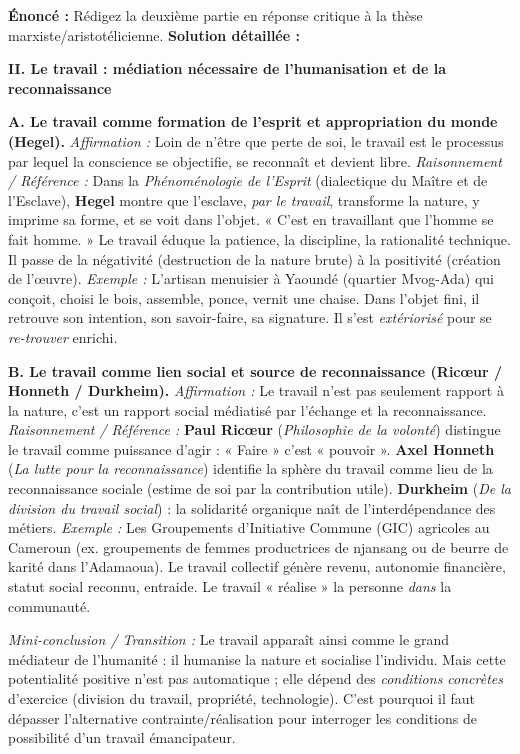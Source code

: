 \documentclass[11pt]{article}
\newcommand{\cle}[1]{{\popxbold\color{popdark}#1}}
\begin{document}
\begin{exoresolu}
\textbf{Énoncé :} Rédigez la deuxième partie en réponse critique à la thèse marxiste/aristotélicienne.
\tcblower
\textbf{Solution détaillée :}

\textbf{II. Le travail : médiation nécessaire de l'humanisation et de la reconnaissance}

\textbf{A. Le travail comme formation de l'esprit et appropriation du monde (Hegel).}
\textit{Affirmation :} Loin de n'être que perte de soi, le travail est le processus par lequel la conscience se objectifie, se reconnaît et devient libre.
\textit{Raisonnement / Référence :} Dans la \emph{Phénoménologie de l'Esprit} (dialectique du Maître et de l'Esclave), \textbf{Hegel} montre que l'esclave, \emph{par le travail}, transforme la nature, y imprime sa forme, et se voit dans l'objet. « C'est en travaillant que l'homme se fait homme. » Le travail éduque la patience, la discipline, la rationalité technique. Il passe de la \cle{négativité} (destruction de la nature brute) à la \cle{positivité} (création de l'œuvre).
\textit{Exemple :} L'artisan menuisier à Yaoundé (quartier Mvog-Ada) qui conçoit, choisi le bois, assemble, ponce, vernit une chaise. Dans l'objet fini, il retrouve son intention, son savoir-faire, sa signature. Il s'est \emph{extériorisé} pour se \emph{re-trouver} enrichi.

\textbf{B. Le travail comme lien social et source de reconnaissance (Ricœur / Honneth / Durkheim).}
\textit{Affirmation :} Le travail n'est pas seulement rapport à la nature, c'est un rapport social médiatisé par l'échange et la reconnaissance.
\textit{Raisonnement / Référence :} \textbf{Paul Ricœur} (\emph{Philosophie de la volonté}) distingue le travail comme \cle{puissance d'agir} : « Faire » c'est « pouvoir ». \textbf{Axel Honneth} (\emph{La lutte pour la reconnaissance}) identifie la sphère du travail comme lieu de la \cle{reconnaissance sociale} (estime de soi par la contribution utile). \textbf{Durkheim} (\emph{De la division du travail social}) : la solidarité organique naît de l'interdépendance des métiers.
\textit{Exemple :} Les \cle{Groupements d'Initiative Commune (GIC)} agricoles au Cameroun (ex. groupements de femmes productrices de njansang ou de beurre de karité dans l'Adamaoua). Le travail collectif génère revenu, autonomie financière, statut social reconnu, entraide. Le travail « réalise » la personne \emph{dans} la communauté.

\textit{Mini-conclusion / Transition :} Le travail apparaît ainsi comme le grand \cle{médiateur} de l'humanité : il humanise la nature et socialise l'individu. Mais cette potentialité positive n'est pas automatique ; elle dépend des \emph{conditions concrètes} d'exercice (division du travail, propriété, technologie). C'est pourquoi il faut dépasser l'alternative contrainte/réalisation pour interroger les conditions de possibilité d'un travail émancipateur.
\end{exoresolu}
\end{document}
